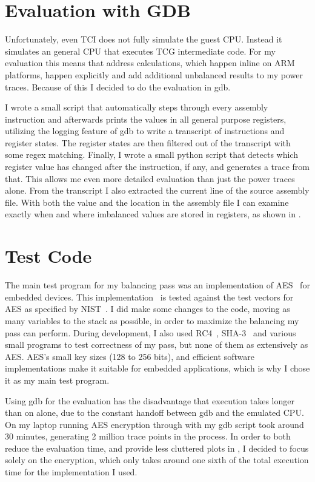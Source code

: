 \section{Evaluation with GDB}
Unfortunately, even TCI does not fully simulate the guest CPU.
Instead it simulates an general CPU that executes TCG intermediate code.
For my evaluation this means that address calculations, which happen inline on ARM platforms, happen explicitly and add additional unbalanced results to my power traces.
Because of this I decided to do the evaluation in gdb.

I wrote a small script that automatically steps through every assembly instruction and afterwards prints the values in all general purpose registers, utilizing the logging feature of gdb to write a transcript of instructions and register states.
The register states are then filtered out of the transcript with some regex matching.
Finally, I wrote a small python script that detects which register value has changed after the instruction, if any, and generates a trace from that.
This allows me even more detailed evaluation than just the power traces alone.
From the transcript I also extracted the current line of the source assembly file.
With both the value and the location in the assembly file I can examine exactly when and where imbalanced values are stored in registers, as shown in .

\section{Test Code}
The main test program for my balancing pass was an implementation of AES~\cite{daemen2013design} for embedded devices.
This implementation~\cite{tinyaes} is tested against the test vectors for AES as specified by NIST~\cite{dworkin2001recommendation}.
I did make some changes to the code, moving as many variables to the stack as possible, in order to maximize the balancing my pass can perform.
During development, I also used RC4~\cite{rc4}, SHA-3~\cite{bertoni2013keccak} and various small programs to test correctness of my pass, but none of them as extensively as AES.
AES's small key sizes (128 to 256 bits), and efficient software implementations make it suitable for embedded applications, which is why I chose it as my main test program.

Using gdb for the evaluation has the disadvantage that execution takes longer than on \qemu{} alone, due to the constant handoff between gdb and the emulated CPU.
On my laptop running AES encryption through \qemu{} with my gdb script took around 30 minutes, generating 2 million trace points in the process.
In order to both reduce the evaluation time, and provide less cluttered plots in , I decided to focus solely on the encryption, which only takes around one sixth of the total execution time for the implementation I used.

